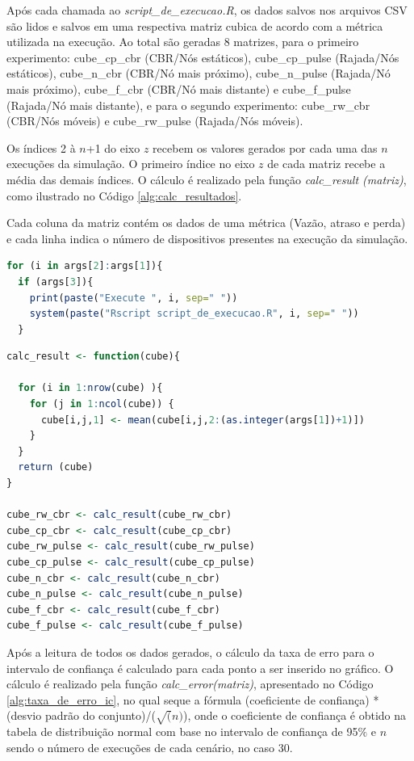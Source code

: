 \documentclass[12pt]{article}
\begin{document}
Após cada chamada ao \textit{script\_de\_execucao.R}, os dados salvos nos arquivos CSV são lidos e salvos em uma respectiva matriz cubica de acordo com a métrica utilizada na execução. Ao total são geradas 8 matrizes, para o primeiro experimento: cube\_cp\_cbr (CBR/Nós estáticos), cube\_cp\_pulse (Rajada/Nós estáticos), cube\_n\_cbr (CBR/Nó mais próximo), cube\_n\_pulse (Rajada/Nó mais próximo), cube\_f\_cbr (CBR/Nó mais distante) e cube\_f\_pulse (Rajada/Nó mais distante), e para o segundo experimento: cube\_rw\_cbr (CBR/Nós móveis) e cube\_rw\_pulse (Rajada/Nós móveis).

Os índices 2 à $n$+1 do eixo $z$ recebem os valores gerados por cada uma das $n$ execuções da simulação. O primeiro índice no eixo $z$ de cada matriz recebe a média das demais índices. O cálculo é realizado pela função \textit{calc\_result (matriz)}, como ilustrado no Código \ref{alg:calc_resultados}.

Cada coluna da matriz contém os dados de uma métrica (Vazão, atraso e perda) e cada linha indica o número de dispositivos presentes na execução da simulação.

\begin{lstlisting}[language=R, caption=Laço de repetição para execução da simulação, label=alg:call_repeticoes]
for (i in args[2]:args[1]){
  if (args[3]){
    print(paste("Execute ", i, sep=" "))
    system(paste("Rscript script_de_execucao.R", i, sep=" "))
  }
\end{lstlisting}

\begin{lstlisting}[language=R, caption=Geração dos resultados, label=alg:calc_resultados]
calc_result <- function(cube){

  for (i in 1:nrow(cube) ){
    for (j in 1:ncol(cube)) {
      cube[i,j,1] <- mean(cube[i,j,2:(as.integer(args[1])+1)])
    }
  }
  return (cube)
}

cube_rw_cbr <- calc_result(cube_rw_cbr)
cube_cp_cbr <- calc_result(cube_cp_cbr)
cube_rw_pulse <- calc_result(cube_rw_pulse)
cube_cp_pulse <- calc_result(cube_cp_pulse)
cube_n_cbr <- calc_result(cube_n_cbr)
cube_n_pulse <- calc_result(cube_n_pulse)
cube_f_cbr <- calc_result(cube_f_cbr)
cube_f_pulse <- calc_result(cube_f_pulse)

\end{lstlisting}

Após a leitura de todos os dados gerados, o cálculo da taxa de erro para o intervalo de confiança é calculado para cada ponto a ser inserido no gráfico. O cálculo é realizado pela função \textit{calc\_error(matriz)}, apresentado no Código \ref{alg:taxa_de_erro_ic}, no qual seque a fórmula (coeficiente de confiança) * (desvio padrão do conjunto)/($\sqrt(n)$), onde o coeficiente de confiança é obtido na tabela de distribuição normal com base no intervalo de confiança de 95$\%$ e $n$ sendo o número de execuções de cada cenário, no caso 30.
\end{document}
